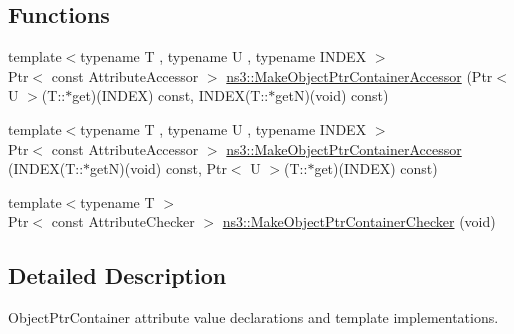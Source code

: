 \subsection*{Functions}
\begin{DoxyCompactItemize}
\item 
{\footnotesize template$<$typename T , typename U , typename I\+N\+D\+EX $>$ }\\Ptr$<$ const Attribute\+Accessor $>$ \hyperlink{namespacens3_a27492bed56d5266007f881de9b5c1dbf}{ns3\+::\+Make\+Object\+Ptr\+Container\+Accessor} (Ptr$<$ U $>$(T\+::$\ast$get)(I\+N\+D\+EX) const, I\+N\+D\+EX(T\+::$\ast$getN)(void) const)
\item 
{\footnotesize template$<$typename T , typename U , typename I\+N\+D\+EX $>$ }\\Ptr$<$ const Attribute\+Accessor $>$ \hyperlink{namespacens3_afba8b8f22d0b3a855b98519f7bdc1777}{ns3\+::\+Make\+Object\+Ptr\+Container\+Accessor} (I\+N\+D\+EX(T\+::$\ast$getN)(void) const, Ptr$<$ U $>$(T\+::$\ast$get)(I\+N\+D\+EX) const)
\item 
{\footnotesize template$<$typename T $>$ }\\Ptr$<$ const Attribute\+Checker $>$ \hyperlink{namespacens3_a536d82c913e136817dfab1ac97a91c10}{ns3\+::\+Make\+Object\+Ptr\+Container\+Checker} (void)
\end{DoxyCompactItemize}


\subsection{Detailed Description}
Object\+Ptr\+Container attribute value declarations and template implementations. 